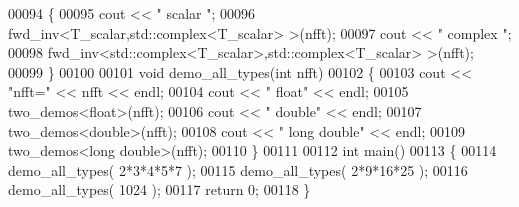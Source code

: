 \begin{DoxyCode}
00094 \{
00095     cout << \textcolor{stringliteral}{"     scalar "};
00096     fwd\_inv<T\_scalar,std::complex<T\_scalar> >(nfft);
00097     cout << \textcolor{stringliteral}{"    complex "};
00098     fwd\_inv<std::complex<T\_scalar>,std::complex<T\_scalar> >(nfft);
00099 \}
00100 
00101 \textcolor{keywordtype}{void} demo\_all\_types(\textcolor{keywordtype}{int} nfft)
00102 \{
00103     cout << \textcolor{stringliteral}{"nfft="} << nfft << endl;
00104     cout << \textcolor{stringliteral}{"   float"} << endl;
00105     two\_demos<float>(nfft);
00106     cout << \textcolor{stringliteral}{"   double"} << endl;
00107     two\_demos<double>(nfft);
00108     cout << \textcolor{stringliteral}{"   long double"} << endl;
00109     two\_demos<long double>(nfft);
00110 \}
00111 
00112 \textcolor{keywordtype}{int} main()
00113 \{
00114     demo\_all\_types( 2*3*4*5*7 );
00115     demo\_all\_types( 2*9*16*25 );
00116     demo\_all\_types( 1024 );
00117     \textcolor{keywordflow}{return} 0;
00118 \}
\end{DoxyCode}
